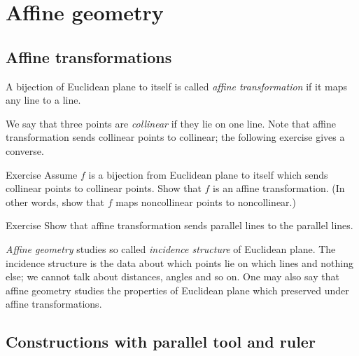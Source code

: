 
\chapter{Affine geometry}\label{chap:trans}

\section*{Affine transformations}

A bijection of Euclidean plane to itself 
is called \emph{affine transformation}
if it maps any line to a line.

We say that three points are \emph{collinear} if they lie on one line. 
Note that affine transformation sends collinear points to collinear; the following exercise gives a converse.

\begin{thm}{Exercise}\label{ex:collinear=affine}
Assume $f$ is a bijection from Euclidean plane to itself which sends collinear points to collinear points.
Show that $f$ is an affine transformation.
(In other words, show that $f$ maps noncollinear points to noncollinear.)
\end{thm}

\begin{thm}{Exercise}\label{ex:affine-par}
Show that affine transformation sends parallel lines to the parallel lines.
\end{thm}

\emph{Affine geometry} studies  so called \emph{incidence structure} of Euclidean plane.
The incidence structure is the data about which points lie on which lines and nothing else;
we cannot talk about distances, angles and so on.
One may also say that affine geometry studies
the properties of Euclidean plane which preserved under affine transformations.

\section*{Constructions with parallel tool and ruler}

